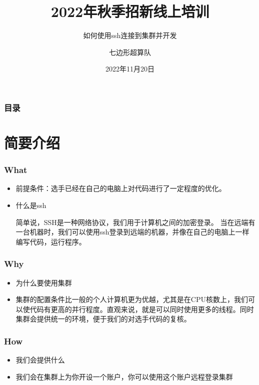 \documentclass{beamer}
\title{2022年秋季招新线上培训}
\subtitle{如何使用ssh连接到集群并开发}
\author{七边形超算队}
\institute{华中科技大学}
\date{2022年11月20日}
\begin{document}


\frame{\titlepage}

\begin{frame}
\frametitle{目录}
\tableofcontents
\end{frame}


\section{简要介绍}

\begin{frame}
\frametitle{What}

\begin{itemize}
    \item<1-> 前提条件：选手已经在自己的电脑上对代码进行了一定程度的优化。
    \item<2-> 什么是ssh 
    
简单说，SSH是一种网络协议，我们用于计算机之间的加密登录。
当在远端有一台机器时，我们可以使用ssh登录到远端的机器，并像在自己的电脑上一样编写代码，运行程序。
    
\end{itemize}

\end{frame}

\begin{frame}
\frametitle{Why}
\begin{itemize}
    \item<1-> 为什么要使用集群
    \item<2-> 集群的配置条件比一般的个人计算机更为优越，尤其是在CPU核数上，我们可以使代码有更高的并行程度。直观来说，就是可以同时使用更多的线程。同时集群会提供统一的环境，便于我们的对选手代码的复核。
\end{itemize}
\end{frame}

\begin{frame}
\frametitle{How}
\begin{itemize}
    \item<1-> 我们会提供什么
    \item<2-> 我们会在集群上为你开设一个账户，你可以使用这个账户远程登录集群
\end{itemize}
\end{frame}
\end{document}

